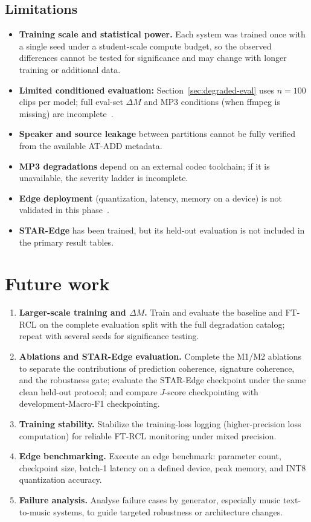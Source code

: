\subsection{Limitations}

\begin{itemize}[itemsep=2pt,topsep=2pt,parsep=0pt]
  \item \textbf{Training scale and statistical power.} Each system was trained once with a single seed under a student-scale compute budget, so the observed differences cannot be tested for significance and may change with longer training or additional data.
  \item \textbf{Limited conditioned evaluation:} Section~\ref{sec:degraded-eval} uses $n{=}100$ clips per model; full eval-set $\Delta M$ and MP3 conditions (when ffmpeg is missing) are incomplete~\cite{gao2024p2v,zhang2025sensorsSurvey}.
  \item \textbf{Speaker and source leakage} between partitions cannot be fully verified from the available AT-ADD metadata.
  \item \textbf{MP3 degradations} depend on an external codec toolchain; if it is unavailable, the severity ladder is incomplete.
  \item \textbf{Edge deployment} (quantization, latency, memory on a device) is not validated in this phase~\cite{rabhi2024adversarial,alnaqbi2026systematic}.
  \item \textbf{STAR-Edge} has been trained, but its held-out evaluation is not included in the primary result tables.
\end{itemize}

\section{Future work}

\begingroup
\setlength{\parskip}{0.35em}
\begin{enumerate}[label=\textbf{\arabic*.},leftmargin=*,itemsep=0.35em,topsep=0pt]
  \item \textbf{Larger-scale training and $\Delta M$.} Train and evaluate the baseline and FT-RCL on the complete evaluation split with the full degradation catalog; repeat with several seeds for significance testing.
  \item \textbf{Ablations and STAR-Edge evaluation.} Complete the M1/M2 ablations to separate the contributions of prediction coherence, signature coherence, and the robustness gate; evaluate the STAR-Edge checkpoint under the same clean held-out protocol; and compare $J$-score checkpointing with development-Macro-F1 checkpointing.
  \item \textbf{Training stability.} Stabilize the training-loss logging (higher-precision loss computation) for reliable FT-RCL monitoring under mixed precision.
  \item \textbf{Edge benchmarking.} Execute an edge benchmark: parameter count, checkpoint size, batch-1 latency on a defined device, peak memory, and INT8 quantization accuracy.
  \item \textbf{Failure analysis.} Analyse failure cases by generator, especially music text-to-music systems, to guide targeted robustness or architecture changes.
\end{enumerate}
\endgroup
